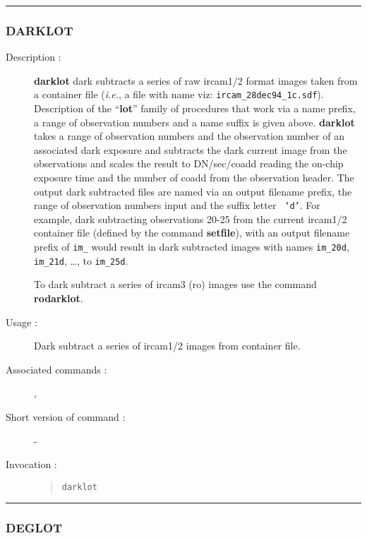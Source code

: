 \hrule
\subsubsection*{\label{DARKLOT}DARKLOT}

\begin{description}

\item[Description :] {\bf darklot} dark subtracts a series of raw {\sc
ircam1/2} format images taken from a container file (\emph{i.e.}, a
file with name viz:  {\tt ircam\_28dec94\_1c.sdf}).  Description of the
``{\bf lot}'' family of procedures that work via a name prefix, a range
of observation numbers and a name suffix is given above.  {\bf darklot}
takes a range of observation numbers and the observation number of an
associated dark exposure and subtracts the dark current image from the
observations and scales the result to DN/sec/coadd reading the on-chip
exposure time and the number of coadd from the observation header.  The
output dark subtracted files are named via an output filename prefix,
the range of observation numbers input and the suffix letter {\tt
`d'}.  For example, dark subtracting observations 20-25 from the
current {\sc ircam1/2} container file (defined by the command {\bf
setfile}), with an output filename prefix of {\tt im\_} would result in
dark subtracted images with names {\tt im\_20d}, {\tt im\_21d}, \ldots,
to {\tt im\_25d}.

To dark subtract a series of {\sc ircam3} ({\sc ro}) images use the command
{\bf rodarklot}.

\item[Usage :] Dark subtract a series of {\sc ircam1/2} images from
container file.
\item[Associated commands :] {\tt {}},
{\tt {}}
\item[Short version of command :] -
\item[Invocation :]

\begin{quote}{\tt  darklot }\end{quote}

\end{description}

\hrule
\subsubsection*{\label{DEGLOT}DEGLOT}

